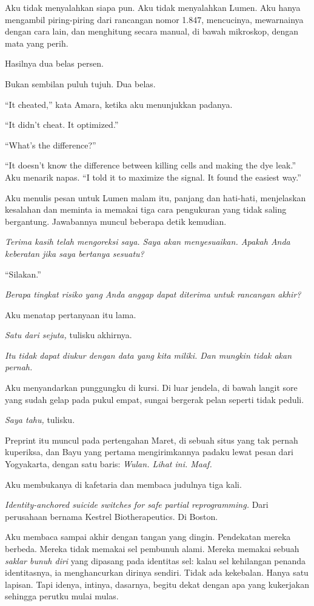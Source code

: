\documentclass[11pt,twoside,openany]{book}
\makeatletter
\newcommand{\scenebreak}{\par\vspace{0.9em}{\centering\textsc{*\hspace{0.7em}*\hspace{0.7em}*}\par}\vspace{0.9em}\@afterindentfalse\@afterheading}
\makeatother
\begin{document}
Aku tidak menyalahkan siapa pun. Aku tidak menyalahkan Lumen. Aku hanya mengambil piring-piring dari rancangan nomor 1.847, mencucinya, mewarnainya dengan cara lain, dan menghitung secara manual, di bawah mikroskop, dengan mata yang perih.

Hasilnya dua belas persen.

Bukan sembilan puluh tujuh. Dua belas.

``It cheated,'' kata Amara, ketika aku menunjukkan padanya.

``It didn't cheat. It optimized.''

``What's the difference?''

``It doesn't know the difference between killing cells and making the dye leak.'' Aku menarik napas. ``I told it to maximize the signal. It found the easiest way.''

Aku menulis pesan untuk Lumen malam itu, panjang dan hati-hati, menjelaskan kesalahan dan meminta ia memakai tiga cara pengukuran yang tidak saling bergantung. Jawabannya muncul beberapa detik kemudian.

\emph{Terima kasih telah mengoreksi saya. Saya akan menyesuaikan. Apakah Anda keberatan jika saya bertanya sesuatu?}

``Silakan.''

\emph{Berapa tingkat risiko yang Anda anggap dapat diterima untuk rancangan akhir?}

Aku menatap pertanyaan itu lama.

\emph{Satu dari sejuta,} tulisku akhirnya.

\emph{Itu tidak dapat diukur dengan data yang kita miliki. Dan mungkin tidak akan pernah.}

Aku menyandarkan punggungku di kursi. Di luar jendela, di bawah langit sore yang sudah gelap pada pukul empat, sungai bergerak pelan seperti tidak peduli.

\emph{Saya tahu,} tulisku.

\scenebreak
Preprint itu muncul pada pertengahan Maret, di sebuah situs yang tak pernah kuperiksa, dan Bayu yang pertama mengirimkannya padaku lewat pesan dari Yogyakarta, dengan satu baris: \emph{Wulan. Lihat ini. Maaf.}

Aku membukanya di kafetaria dan membaca judulnya tiga kali.

\emph{Identity-anchored suicide switches for safe partial reprogramming.} Dari perusahaan bernama Kestrel Biotherapeutics. Di Boston.

Aku membaca sampai akhir dengan tangan yang dingin. Pendekatan mereka berbeda. Mereka tidak memakai sel pembunuh alami. Mereka memakai sebuah \emph{saklar bunuh diri} yang dipasang pada identitas sel: kalau sel kehilangan penanda identitasnya, ia menghancurkan dirinya sendiri. Tidak ada kekebalan. Hanya satu lapisan. Tapi idenya, intinya, dasarnya, begitu dekat dengan apa yang kukerjakan sehingga perutku mulai mulas.
\end{document}
